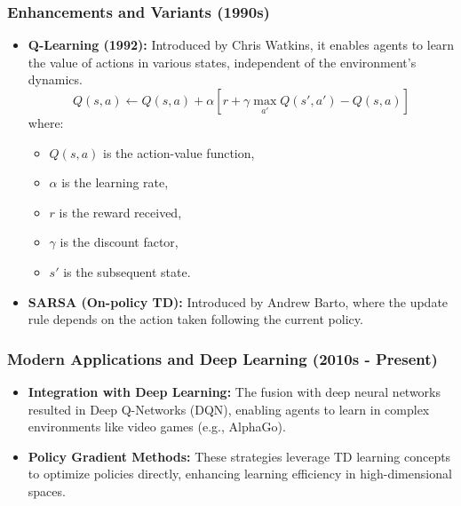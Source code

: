 \documentclass[aspectratio=169]{beamer}
\begin{document}
\begin{frame}[fragile]
    \frametitle{Enhancements and Variants (1990s)}
    \begin{itemize}
        \item \textbf{Q-Learning (1992):} Introduced by Chris Watkins, it enables agents to learn the value of actions in various states, independent of the environment's dynamics.
        \begin{equation}
            Q(s, a) \leftarrow Q(s, a) + \alpha \left[ r + \gamma \max_{a'} Q(s', a') - Q(s, a) \right]
        \end{equation}
        where:
        \begin{itemize}
            \item \(Q(s, a)\) is the action-value function,
            \item \(\alpha\) is the learning rate,
            \item \(r\) is the reward received,
            \item \(\gamma\) is the discount factor,
            \item \(s'\) is the subsequent state.
        \end{itemize}
        
        \item \textbf{SARSA (On-policy TD):} Introduced by Andrew Barto, where the update rule depends on the action taken following the current policy.
    \end{itemize}
\end{frame}

\begin{frame}[fragile]
    \frametitle{Modern Applications and Deep Learning (2010s - Present)}
    \begin{itemize}
        \item \textbf{Integration with Deep Learning:} The fusion with deep neural networks resulted in Deep Q-Networks (DQN), enabling agents to learn in complex environments like video games (e.g., AlphaGo).
        \item \textbf{Policy Gradient Methods:} These strategies leverage TD learning concepts to optimize policies directly, enhancing learning efficiency in high-dimensional spaces.
    \end{itemize}
\end{frame}
\end{document}
